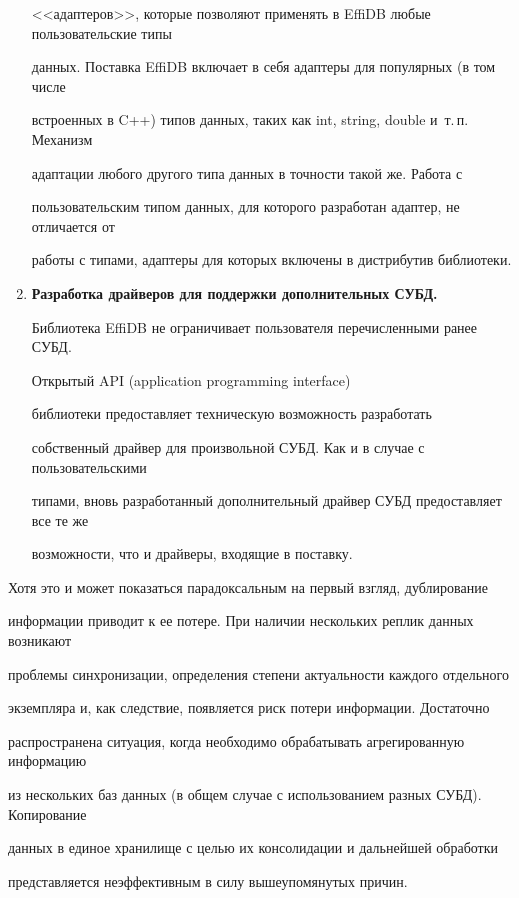 \begin{multicols}{2}
\begin{enumerate}
<<адаптеров>>, которые позволяют применять в \mbox{EffiDB} любые пользовательские типы 

данных. Поставка \mbox{EffiDB} включает в себя адаптеры для популярных (в том числе 

встроенных в C++) типов данных, таких как int, string, double и~т.\,п. Механизм 

адаптации любого другого типа данных в точности такой же. Работа с 

пользовательским типом данных, для которого разработан адаптер, не отличается от 

работы с типами, адаптеры для которых включены в дистрибутив библиотеки.

\item \textbf{Разработка драйверов для поддержки дополнительных СУБД.} 

Библиотека EffiDB не ограничивает пользователя перечисленными ранее СУБД. 

Открытый API (application programming interface)

библиотеки предоставляет техническую возможность разработать 

собственный драйвер для произвольной СУБД. Как и в случае с пользовательскими 

типами, вновь разработанный дополнительный драйвер СУБД предостав\-ляет все те же 

возможности, что и драйверы, входящие в поставку.

\end{enumerate}



Хотя это и может показаться парадоксальным на первый взгляд, дублирование 

информации приводит к ее потере. При наличии нескольких реп\-лик данных возникают 

проблемы синхронизации, определения степени актуальности каждого отдельного 

экземпляра и, как следствие, появляется риск потери информации. Достаточно 

распространена ситуация, когда необходимо обрабатывать агрегированную информацию 

из нескольких баз данных (в общем случае с использованием разных СУБД). Копирование 

данных в единое хранилище с целью их консолидации и дальнейшей обработки 

пред\-став\-ля\-ет\-ся неэффективным в силу вышеупомянутых причин.




\end{multicols}
